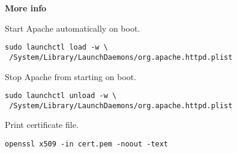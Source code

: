 \documentclass[12pt]{article}
\begin{document}
\noindent
{\bf More info}

\noindent
Start Apache automatically on boot.

\begin{Verbatim}
sudo launchctl load -w \
 /System/Library/LaunchDaemons/org.apache.httpd.plist
\end{Verbatim}

\noindent
Stop Apache from starting on boot.

\begin{Verbatim}
sudo launchctl unload -w \
 /System/Library/LaunchDaemons/org.apache.httpd.plist
\end{Verbatim}

\noindent
Print certificate file.

\begin{Verbatim}
openssl x509 -in cert.pem -noout -text
\end{Verbatim}
\end{document}
